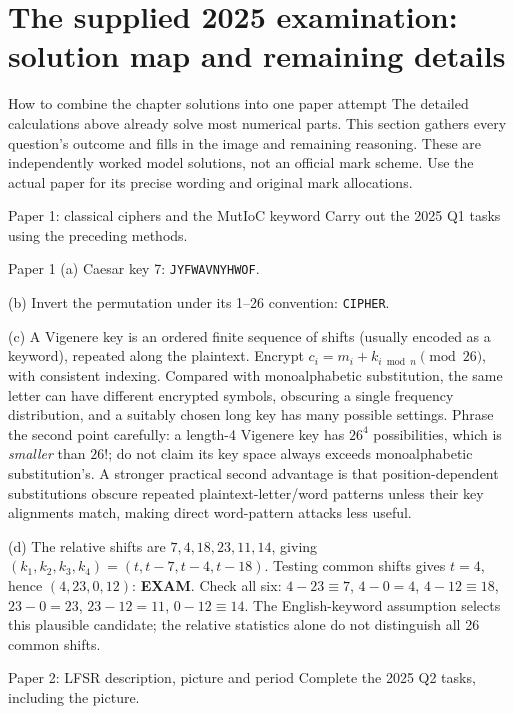\documentclass[11pt,a4paper]{article}
\begin{document}
\section{The supplied 2025 examination: solution map and remaining details}
\begin{concept}{How to combine the chapter solutions into one paper attempt}
The detailed calculations above already solve most numerical parts. This section gathers every question's outcome and fills in the image and remaining reasoning. These are independently worked model solutions, not an official mark scheme. Use the actual paper for its precise wording and original mark allocations.
\end{concept}
\begin{question}{Paper 1: classical ciphers and the MutIoC keyword}
Carry out the 2025 Q1 tasks using the preceding methods.
\end{question}
\begin{answer}{Paper 1}
(a) Caesar key 7: \texttt{JYFWAVNYHWOF}.

(b) Invert the permutation under its 1--26 convention: \texttt{CIPHER}.

(c) A Vigenere key is an ordered finite sequence of shifts (usually encoded as a keyword), repeated along the plaintext. Encrypt \(c_i=m_i+k_{i\bmod n}\pmod{26}\), with consistent indexing. Compared with monoalphabetic substitution, the same letter can have different encrypted symbols, obscuring a single frequency distribution, and a suitably chosen long key has many possible settings. Phrase the second point carefully: a length-4 Vigenere key has \(26^4\) possibilities, which is \emph{smaller} than \(26!\); do not claim its key space always exceeds monoalphabetic substitution's. A stronger practical second advantage is that position-dependent substitutions obscure repeated plaintext-letter/word patterns unless their key alignments match, making direct word-pattern attacks less useful.

(d) The relative shifts are \(7,4,18,23,11,14\), giving \((k_1,k_2,k_3,k_4)=(t,t-7,t-4,t-18)\). Testing common shifts gives \(t=4\), hence \((4,23,0,12)\): \textbf{EXAM}. Check all six: \(4-23\equiv7\), \(4-0=4\), \(4-12\equiv18\), \(23-0=23\), \(23-12=11\), \(0-12\equiv14\). The English-keyword assumption selects this plausible candidate; the relative statistics alone do not distinguish all 26 common shifts.
\end{answer}
\begin{question}{Paper 2: LFSR description, picture and period}
Complete the 2025 Q2 tasks, including the picture.
\end{question}
\end{document}
